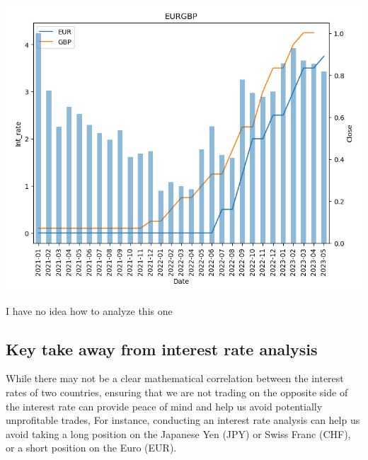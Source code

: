 \documentclass{article}
\begin{document}
\begin{center}
   \includegraphics[scale=0.8]{p20.png}    
\end{center}
I have no idea how to analyze this one

\subsection{Key take away from interest rate analysis}
While there may not be a clear mathematical correlation between the interest rates of two countries, ensuring that we are not trading on the opposite side of the interest rate can provide peace of mind and help us avoid potentially unprofitable trades, For instance, conducting an interest rate analysis can help us avoid taking a long position on the Japanese Yen (JPY) or Swiss Franc (CHF), or a short position on the Euro (EUR).
\end{document}
